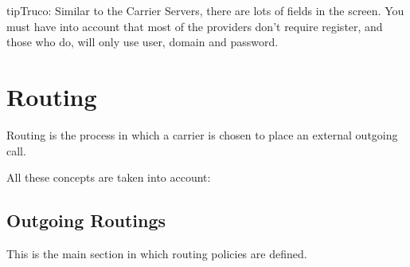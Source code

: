 \documentclass[letterpaper,10pt,spanish]{sphinxmanual}
\begin{document}
\begin{notice}{tip}{Truco:}
Similar to the Carrier Servers, there are lots of fields in the screen.
You must have into account that most of the providers don't require register,
and those who do, will only use user, domain and password.
\end{notice}


\section{Routing}
\label{administration_portal/brand/routing/index::doc}\label{administration_portal/brand/routing/index:routing}
Routing is the process in which a carrier is chosen to place an external outgoing call.

All these concepts are taken into account:


\subsection{Outgoing Routings}
\label{administration_portal/brand/routing/outgoing_routings:routes-weights}\label{administration_portal/brand/routing/outgoing_routings::doc}\label{administration_portal/brand/routing/outgoing_routings:outgoing-routings}
This is the main section in which routing policies are defined.
\end{document}
